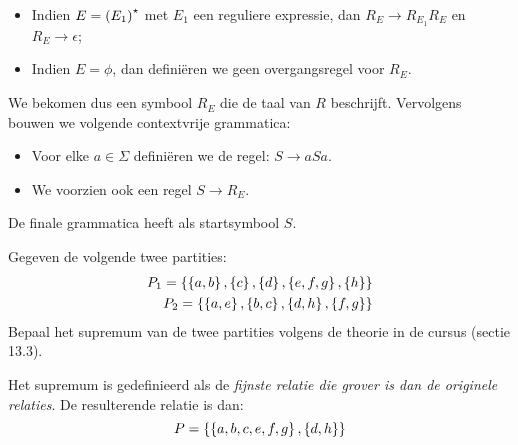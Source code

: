 \documentclass{article}
\begin{document}
\begin{answer}
\begin{enumerate}
\begin{itemize}
  \item Indien $E=\left( E_1 \right)^\star$ met $E_1$ een reguliere expressie, dan $R_E\rightarrow R_{E_1}R_E$ en $R_E\rightarrow \epsilon$;
  \item Indien $E=\phi$, dan defini\"eren we geen overgangsregel voor $R_E$.
 \end{itemize}
We bekomen dus een symbool $R_E$ die de taal van $R$ beschrijft. Vervolgens bouwen we volgende contextvrije grammatica:
\begin{itemize}
 \item Voor elke $a\in\Sigma$ defini\"eren we de regel: $S\rightarrow aSa$.
 \item We voorzien ook een regel $S\rightarrow R_E$.
\end{itemize}
De finale grammatica heeft als startsymbool $S$.
\end{enumerate}
\end{answer}
\begin{question}
Gegeven de volgende twee partities:
\begin{eqnarray}
P_1=\left\{ \left\{ a,b \right\},\left\{ c \right\},\left\{ d \right\},\left\{ e,f,g \right\},\left\{ h \right\}  \right\}\\
P_2=\left\{ \left\{ a,e \right\},\left\{ b,c \right\},\left\{ d,h \right\},\left\{ f,g \right\}  \right\}
\end{eqnarray}
Bepaal het supremum van de twee partities volgens de theorie in de cursus (sectie 13.3).
\end{question}
\begin{answer}
Het supremum is gedefinieerd als de \emph{fijnste relatie die grover is dan de originele relaties}. De resulterende relatie is dan:
\begin{equation}
P=\left\{ \left\{ a,b,c,e,f,g \right\},\left\{ d,h \right\}  \right\}
\end{equation}
\end{answer}
\end{document}

